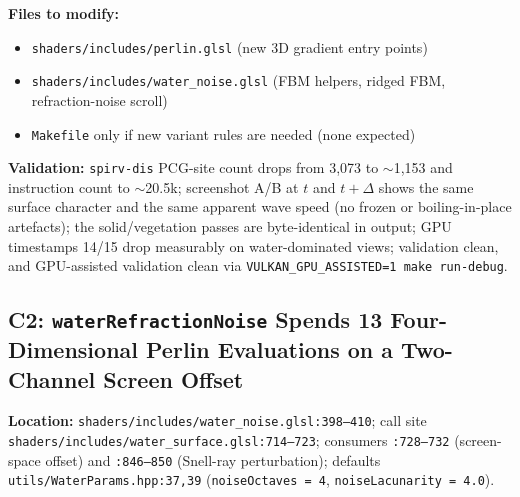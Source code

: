 \documentclass[11pt,a4paper]{article}
\begin{document}
\begin{tcolorbox}[promptbox={Prompt: Drop the Fourth Noise Axis from the Water Field}]
\textbf{Files to modify:}
\begin{itemize}
    \item \texttt{shaders/includes/perlin.glsl} (new 3D gradient entry points)
    \item \texttt{shaders/includes/water\_noise.glsl} (FBM helpers, ridged FBM, refraction-noise scroll)
    \item \texttt{Makefile} only if new variant rules are needed (none expected)
\end{itemize}

\textbf{Validation:} \texttt{spirv-dis} PCG-site count drops from 3,073 to $\sim$1,153 and instruction count to
$\sim$20.5k; screenshot A/B at $t$ and $t+\Delta$ shows the same surface character and the same apparent wave speed
(no frozen or boiling-in-place artefacts); the solid/vegetation passes are byte-identical in output; GPU timestamps
14/15 drop measurably on water-dominated views; validation clean, and GPU-assisted validation clean via
\texttt{VULKAN\_GPU\_ASSISTED=1 make run-debug}.
\end{tcolorbox}

\subsection{C2: \texttt{waterRefractionNoise} Spends 13 Four-Dimensional Perlin Evaluations on a Two-Channel Screen Offset}

\textbf{Location:} \texttt{shaders/includes/water\_noise.glsl:398--410}; call site
\texttt{shaders/includes/water\_surface.glsl:714--723}; consumers \texttt{:728--732} (screen-space offset) and
\texttt{:846--850} (Snell-ray perturbation); defaults \texttt{utils/WaterParams.hpp:37,39}
(\texttt{noiseOctaves = 4}, \texttt{noiseLacunarity = 4.0}).
\end{document}
